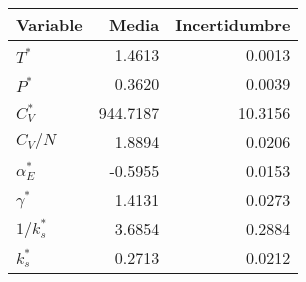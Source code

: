 \begin{tabular}{lrr}
\toprule
Variable & Media & Incertidumbre \\
\midrule
$T^*$ & 1.4613 & 0.0013 \\
$P^*$ & 0.3620 & 0.0039 \\
$C_V^*$ & 944.7187 & 10.3156 \\
$C_V/N$ & 1.8894 & 0.0206 \\
$\alpha_E^*$ & -0.5955 & 0.0153 \\
$\gamma^*$ & 1.4131 & 0.0273 \\
$1/k_s^*$ & 3.6854 & 0.2884 \\
$k_s^*$ & 0.2713 & 0.0212 \\
\bottomrule
\end{tabular}
